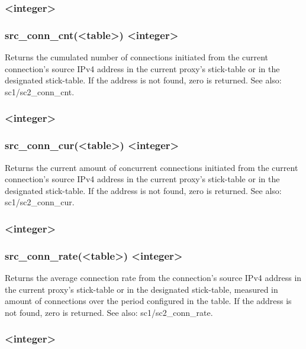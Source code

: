 \subsubsection[src\_conn\_cnt]{ <integer>}
\subsubsection*{src\_conn\_cnt(<table>) <integer>}
  Returns the cumulated number of connections initiated from the current
  connection's source IPv4 address in the current proxy's stick-table or in
  the designated stick-table. If the address is not found, zero is returned.
  See also: sc1/sc2\_conn\_cnt.

\subsubsection[src\_conn\_cur]{ <integer>}
\subsubsection*{src\_conn\_cur(<table>) <integer>}


  Returns the current amount of concurrent connections initiated from the
  current connection's source IPv4 address in the current proxy's stick-table
  or in the designated stick-table. If the address is not found, zero is
  returned. See also: sc1/sc2\_conn\_cur.

\subsubsection[src\_conn\_rate]{ <integer>}
\subsubsection*{src\_conn\_rate(<table>) <integer>}
  Returns the average connection rate from the connection's source IPv4 address
  in the current proxy's stick-table or in the designated stick-table, measured
  in amount of connections over the period configured in the table. If the
  address is not found, zero is returned. See also: sc1/sc2\_conn\_rate.

\subsubsection[src\_get\_gpc0]{ <integer>}
